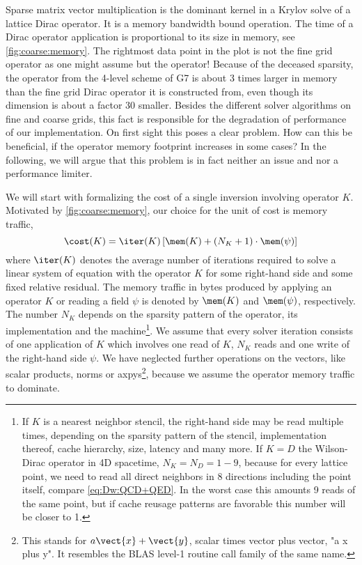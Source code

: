 Sparse matrix vector multiplication is the dominant kernel in a Krylov solve of a lattice Dirac operator.
It is a memory bandwidth bound operation.
The time of a Dirac operator application is proportional to its size in memory, see \cref{fig:coarse:memory}.
The rightmost data point in the plot is not the fine grid operator as one might assume but the  operator!
Because of the deceased sparsity, the  operator from the 4-level scheme of G7 is about \num{3} times larger in memory than the fine grid Dirac operator it is constructed from, even though its dimension is about a factor \num{30} smaller.
Besides the different solver algorithms on fine and coarse grids, this fact is responsible for the degradation of performance of our implementation.
On first sight this poses a clear problem.
How can this be beneficial, if the operator memory footprint increases in some cases?
In the following, we will argue that this problem is in fact neither an issue and nor a performance limiter.

We will start with formalizing the cost of a single inversion involving operator $K$.
Motivated by \cref{fig:coarse:memory}, our choice for the unit of cost is memory traffic,
\begin{equation} \label{eq:numerics:perf:cost:single:rhs}
\cost(K) = \iter(K) \left[ \mem(K) + (N_{K} + 1) \cdot \mem(\psi) \right]
\end{equation}
where $\iter(K)$ denotes the average number of iterations required to solve a linear system of equation with the operator $K$ for some right-hand side and some fixed relative residual.
The memory traffic in bytes produced by applying an operator $K$ or reading a field $\psi$ is denoted by $\mem(K)$ and $\mem(\psi)$, respectively.
The number $N_K$ depends on the sparsity pattern of the operator, its implementation and the machine\footnote{If $K$ is a nearest neighbor stencil, the right-hand side may be read multiple times, depending on the sparsity pattern of the stencil, implementation thereof, cache hierarchy, size, latency and many more. If $K=D$ the Wilson-Dirac operator in 4D spacetime, $N_K = N_D = 1-9$, because for every lattice point, we need to read all direct neighbors in \num{8} directions including the point itself, compare \cref{eq:Dw:QCD+QED}. In the worst case this amounts \num{9} reads of the same point, but if cache reusage patterns are favorable this number will be closer to \num{1}.}.
We assume that every solver iteration consists of one application of $K$ which involves one read of $K$, $N_K$ reads and one write of the right-hand side $\psi$.
We have neglected further operations on the vectors, like scalar products, norms or axpys\footnote{This stands for $a \vect{x} + \vect{y}$, scalar times vector plus vector, "a x plus y". It resembles the BLAS level-1 routine call family of the same name.}, because we assume the operator memory traffic to dominate.

